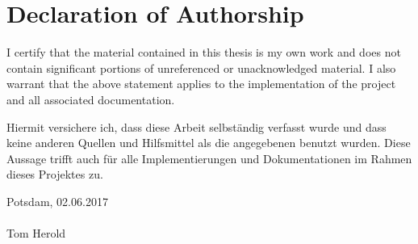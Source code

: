 \section*{Declaration of Authorship}

I certify that the material contained in this thesis is my own work and does
not contain significant portions of unreferenced or unacknowledged material. I also warrant that the above statement applies to the implementation
of the project and all associated documentation.

Hiermit versichere ich, dass diese Arbeit selbst\"andig verfasst wurde und
dass keine anderen Quellen und Hilfsmittel als die angegebenen benutzt
wurden. Diese Aussage trifft auch f\"ur alle Implementierungen und Dokumentationen im Rahmen dieses Projektes zu.

Potsdam, 02.06.2017\\[10ex]




\makebox[2.5in]{\hrulefill}\\
Tom Herold